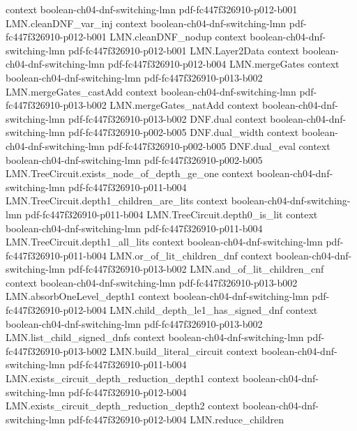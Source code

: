 \begin{lemma}
  {context}
  {boolean-ch04-dnf-switching-lmn}
  {pdf-fc447f326910-p012-b001}
\proofstep
  {LMN.cleanDNF_var_inj}
  {context}
  {boolean-ch04-dnf-switching-lmn}
  {pdf-fc447f326910-p012-b001}
\proofstep
  {LMN.cleanDNF_nodup}
  {context}
  {boolean-ch04-dnf-switching-lmn}
  {pdf-fc447f326910-p012-b001}
\proofstep
  {LMN.Layer2Data}
  {context}
  {boolean-ch04-dnf-switching-lmn}
  {pdf-fc447f326910-p012-b004}
\proofstep
  {LMN.mergeGates}
  {context}
  {boolean-ch04-dnf-switching-lmn}
  {pdf-fc447f326910-p013-b002}
\proofstep
  {LMN.mergeGates_castAdd}
  {context}
  {boolean-ch04-dnf-switching-lmn}
  {pdf-fc447f326910-p013-b002}
\proofstep
  {LMN.mergeGates_natAdd}
  {context}
  {boolean-ch04-dnf-switching-lmn}
  {pdf-fc447f326910-p013-b002}
\proofstep
  {DNF.dual}
  {context}
  {boolean-ch04-dnf-switching-lmn}
  {pdf-fc447f326910-p002-b005}
\proofstep
  {DNF.dual_width}
  {context}
  {boolean-ch04-dnf-switching-lmn}
  {pdf-fc447f326910-p002-b005}
\proofstep
  {DNF.dual_eval}
  {context}
  {boolean-ch04-dnf-switching-lmn}
  {pdf-fc447f326910-p002-b005}
\proofstep
  {LMN.TreeCircuit.exists_node_of_depth_ge_one}
  {context}
  {boolean-ch04-dnf-switching-lmn}
  {pdf-fc447f326910-p011-b004}
\proofstep
  {LMN.TreeCircuit.depth1_children_are_lits}
  {context}
  {boolean-ch04-dnf-switching-lmn}
  {pdf-fc447f326910-p011-b004}
\proofstep
  {LMN.TreeCircuit.depth0_is_lit}
  {context}
  {boolean-ch04-dnf-switching-lmn}
  {pdf-fc447f326910-p011-b004}
\proofstep
  {LMN.TreeCircuit.depth1_all_lits}
  {context}
  {boolean-ch04-dnf-switching-lmn}
  {pdf-fc447f326910-p011-b004}
\proofstep
  {LMN.or_of_lit_children_dnf}
  {context}
  {boolean-ch04-dnf-switching-lmn}
  {pdf-fc447f326910-p013-b002}
\proofstep
  {LMN.and_of_lit_children_cnf}
  {context}
  {boolean-ch04-dnf-switching-lmn}
  {pdf-fc447f326910-p013-b002}
\proofstep
  {LMN.absorbOneLevel_depth1}
  {context}
  {boolean-ch04-dnf-switching-lmn}
  {pdf-fc447f326910-p012-b004}
\proofstep
  {LMN.child_depth_le1_has_signed_dnf}
  {context}
  {boolean-ch04-dnf-switching-lmn}
  {pdf-fc447f326910-p013-b002}
\proofstep
  {LMN.list_child_signed_dnfs}
  {context}
  {boolean-ch04-dnf-switching-lmn}
  {pdf-fc447f326910-p013-b002}
\proofstep
  {LMN.build_literal_circuit}
  {context}
  {boolean-ch04-dnf-switching-lmn}
  {pdf-fc447f326910-p011-b004}
\proofstep
  {LMN.exists_circuit_depth_reduction_depth1}
  {context}
  {boolean-ch04-dnf-switching-lmn}
  {pdf-fc447f326910-p012-b004}
\proofstep
  {LMN.exists_circuit_depth_reduction_depth2}
  {context}
  {boolean-ch04-dnf-switching-lmn}
  {pdf-fc447f326910-p012-b004}
\proofstep
  {LMN.reduce_children}

\end{lemma}
